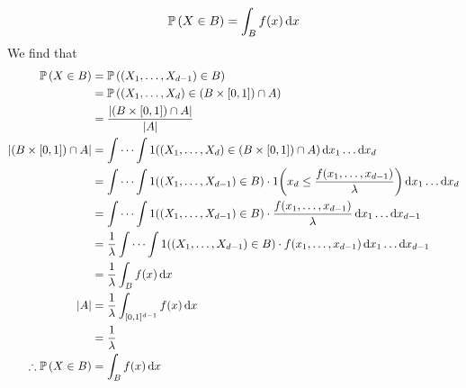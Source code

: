 \[ \mathbb{P}\left({X \in B}\right) = \int_B f(x) \dd{x} \]
We find that
\begin{align*}
	\mathbb{P}\left({X \in B}\right)                 & = \mathbb{P}\left({(X_1, \dots, X_{d-1}) \in B}\right)                                                                                           \\
	                               & = \mathbb{P}\left({(X_1, \dots, X_d) \in (B \times [0, 1]) \cap A}\right)                                                                        \\
	                               & = \frac{\abs{(B \times [0, 1]) \cap A}}{\abs{A}}                                                                               \\
	\abs{(B \times [0, 1]) \cap A} & = \idotsint 1((X_1, \dots, X_d) \in (B \times [0, 1]) \cap A) \dd{x_1} \dots \dd{x_d}                                          \\
	                               & = \idotsint 1((X_1, \dots, X_{d-1}) \in B)\cdot 1\qty(x_d \leq \frac{f(x_1, \dots, x_{d-1})}{\lambda}) \dd{x_1} \dots \dd{x_d} \\
	                               & = \idotsint 1((X_1, \dots, X_{d-1}) \in B)\cdot \frac{f(x_1, \dots, x_{d-1})}{\lambda} \dd{x_1} \dots \dd{x_{d-1}}             \\
	                               & = \frac{1}{\lambda} \idotsint 1((X_1, \dots, X_{d-1}) \in B)\cdot f(x_1, \dots, x_{d-1}) \dd{x_1} \dots \dd{x_{d-1}}           \\
	                               & = \frac{1}{\lambda} \int_B f(x) \dd{x}                                                                                         \\
	\abs{A}                        & = \frac{1}{\lambda} \int_{[0,1]^{d-1}} f(x) \dd{x}                                                                             \\
	                               & = \frac{1}{\lambda}                                                                                                            \\
	\therefore \mathbb{P}\left({X \in B}\right)      & = \int_B f(x) \dd{x}
\end{align*}
